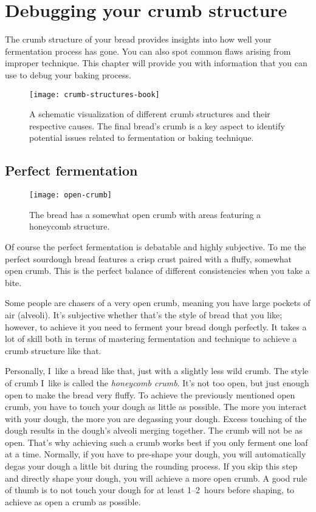 \section{Debugging your crumb structure}%
\label{section:debugging-crumb-structure}

The crumb structure of your bread provides insights into how well
your fermentation process has gone. You can also spot common flaws
arising from improper technique. This chapter will provide you with information
that you can use to debug your baking process.

\begin{figure}
  \texttt{[image: crumb-structures-book]}
  \caption[Debugging your crumb structure]{A schematic visualization of
      different crumb structures and their respective causes. The final bread's
      crumb is a key aspect to identify potential issues related to
      fermentation or baking technique.}%
  \label{fig:crumb-structures-book}
\end{figure}

\subsection{Perfect fermentation}

\begin{figure}
  \texttt{[image: open-crumb]}
  \caption[Perfectly fermented bread]{The bread has a somewhat open crumb
      with areas featuring a honeycomb structure.}%
  \label{fig:open-crumb}
\end{figure}

Of course the perfect fermentation is debatable and highly subjective. To
me the perfect sourdough bread features a crisp crust paired with a fluffy,
somewhat open crumb. This is the perfect balance of different consistencies
when you take a bite.

Some people are chasers of a very open crumb, meaning you have large pockets
of air (alveoli). It's subjective whether that's the style of bread that you like;
however, to achieve it you need to ferment your bread dough perfectly.
It takes a lot of skill both in terms of mastering fermentation and technique
to achieve a crumb structure like that.

Personally, I~like a bread like that, just with a slightly less wild crumb.
The style of crumb I~like is called the \emph{honeycomb crumb}. It's not too open, but
just enough open to make the bread very fluffy. To achieve the previously mentioned open crumb, you
have to touch your dough as little as possible. The more you interact with your
dough, the more you are degassing your dough. Excess touching of the dough
results in the dough's alveoli merging together. The crumb will not be as open.
That's why achieving such a crumb works best if you only ferment
one loaf at a time. Normally, if you have to pre-shape your dough,
you will automatically degas your dough a little bit during the rounding process.
If you skip this step and directly shape your dough, you will achieve a more open crumb.
A good rule of thumb is to not touch your dough for at least 1--2~hours before shaping,
to achieve as open a crumb as possible.

